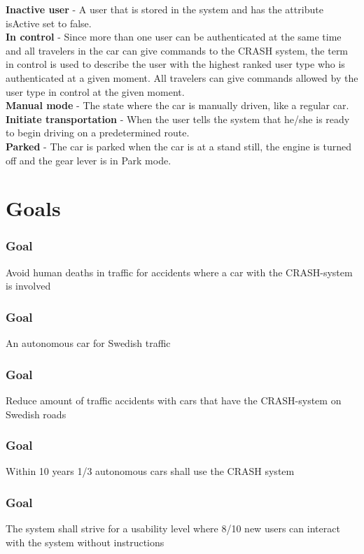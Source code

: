 \documentclass{article}
\begin{document}
\textbf{Inactive user} - A user that is stored in the system and has the attribute isActive set to false. \\
\textbf{In control} - Since more than one user can be authenticated at the same time and all travelers in the car can give commands to the CRASH system, the term in control is used to describe the user with the highest ranked user type who is authenticated at a given moment. All travelers can give commands allowed by the user type in control at the given moment.\\
\textbf{Manual mode} - The state where the car is manually driven, like a regular car.\\
\textbf{Initiate transportation} - When the user tells the system that he/she is ready to begin driving on a predetermined route. \\
\textbf{Parked} - The car is parked when the car is at a stand still, the engine is turned off and the gear lever is in Park mode.

\section{Goals}
    \subsubsection{Goal}
\hfill \break 
\- \- \-Avoid human deaths in traffic for accidents where a car with the CRASH-system is involved
    \subsubsection{Goal}
\hfill \break 
\- \- \-An autonomous car for Swedish traffic
    \subsubsection{Goal}
\hfill \break 
\- \- \-Reduce amount of traffic accidents with cars that have the CRASH-system on Swedish roads
    \subsubsection{Goal}
\hfill \break 
\- \- \-Within 10 years 1/3 autonomous cars shall use the CRASH system
    \subsubsection{Goal}
\hfill \break 
\- \- \-The system shall strive for a usability level where 8/10 new users can interact with the system without instructions
\end{document}
